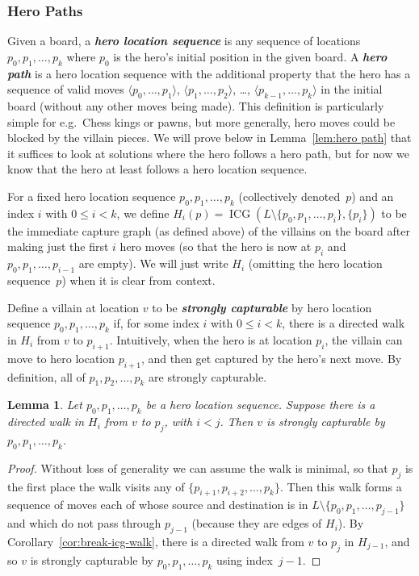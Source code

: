 \documentclass[11pt,letterpaper]{article}
\def\defn#1{\textbf{\textit{\boldmath #1}}}
\newcommand{\ICG}{\operatorname{ICG}}
\theoremstyle{plain}
\newtheorem{lemma}[theorem]{Lemma}
\theoremstyle{definition}
\theoremstyle{remark}
\numberwithin{equation}{section}
\begin{document}
\subsubsection{Hero Paths}

Given a board, a \defn{hero location sequence} is any sequence of locations
$p_0, p_1, \ldots, p_k$ where \(p_0\) is the hero's initial position
in the given board.
A \defn{hero path} is a hero location sequence
with the additional property that the hero has a
sequence of valid moves $\langle p_0, \dots, p_1 \rangle$,
$\langle p_1, \dots, p_2 \rangle$, \dots,
$\langle p_{k-1}, \dots, p_k \rangle$
in the initial board (without any other moves being made).
This definition is particularly simple for e.g.\ Chess kings or pawns,
but more generally, hero moves could be blocked by the villain pieces.
We will prove below in Lemma~\ref{lem:hero path} that it suffices to
look at solutions where the hero follows a hero path,
but for now we know that the hero at least follows a hero location sequence.

For a fixed hero location sequence $p_0, p_1, \ldots, p_k$
(collectively denoted~$p$)
and an index $i$ with $0 \leq i < k$,
we define \(H_i(p) = \ICG(L \setminus \{p_0, p_1, \ldots, p_i\}, \{p_i\})\) to be the immediate capture graph
(as defined above)
of the villains on the board after making just the first \(i\) hero moves
(so that the hero is now at \(p_i\) and \(p_0, p_1, \ldots, p_{i-1}\) are empty).
We will just write \(H_i\) (omitting the hero location sequence~\(p\))
when it is clear from context.

Define a villain at location \(v\) to be \defn{strongly capturable}
by hero location sequence $p_0, p_1, \ldots, p_k$ if,
for some index $i$ with $0 \leq i < k$,
there is a directed walk in \(H_i\) from \(v\) to \(p_{i+1}\).
Intuitively, when the hero is at location $p_i$,
the villain can move to hero location $p_{i+1}$,
and then get captured by the hero's next move.
By definition, all of \(p_1, p_2, \ldots, p_k\) are strongly capturable.

\begin{lemma}
  \label{lem:strongly-capturable-later}
  Let $p_0, p_1, \ldots, p_k$ be a hero location sequence.
  Suppose there is a directed walk in \(H_i\)
  from \(v\) to \(p_j\), with \(i < j\).
  Then \(v\) is strongly capturable by $p_0, p_1, \ldots, p_k$.
\end{lemma}
\begin{proof}
  Without loss of generality we can assume the walk is minimal,
  so that \(p_j\) is the first place the walk visits any of \(\{p_{i+1}, p_{i+2}, \ldots, p_k\}\).
  Then this walk forms a sequence of moves each of whose source and destination
  is in \(L \setminus \{p_0, p_1, \ldots, p_{j-1}\}\) and which do not pass through \(p_{j-1}\) (because they are edges of \(H_i\)).
  By Corollary~\ref{cor:break-icg-walk},
  there is a directed walk from \(v\) to \(p_j\) in \(H_{j-1}\),
  and so \(v\) is strongly capturable by
  $p_0, p_1, \ldots, p_k$ using index~$j-1$.
\end{proof}
\end{document}
